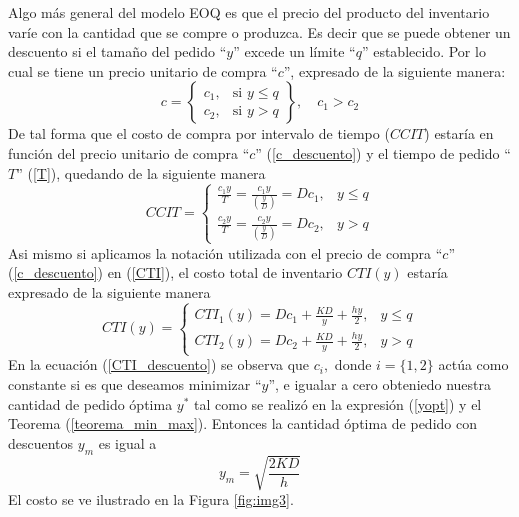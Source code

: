 Algo más general del modelo EOQ es que el precio del producto del inventario  varíe con la cantidad que se compre o produzca. Es decir que se puede obtener un descuento si el tamaño del pedido ``$y$'' excede un límite ``$q$'' establecido. Por lo cual se tiene un precio unitario de compra ``$c$'', expresado de la siguiente manera:
\begin{equation}
	\label{c_descuento}
	c =
	\left\{
	\begin{array}{ll}
		c_1, & \text{si } y \leq q \\
		c_2, & \text{si } y > q
	\end{array}
	\right\}, \quad c_1 > c_2
\end{equation}
De tal forma que el costo de compra por intervalo de tiempo ($CCIT$) estaría en función del precio unitario de compra ``$c$'' (\ref{c_descuento}) y el tiempo de pedido ``$T$'' (\ref{T}), quedando de la siguiente manera
\begin{equation}
	CCIT = \left\{%
	\begin{array}{ll}
		\frac{c_1 y}{T} = \frac{c_1 y}{\left( \frac{y}{D} \right)} = Dc_1 , & y \leq q \\ 
		\frac{c_2 y}{T} = \frac{c_2 y}{\left( \frac{y}{D} \right)} = Dc_2 , & y > q 
	\end{array}%
	\right.
\end{equation}
\clearpage
\noindent Asi mismo si aplicamos la notación utilizada con el precio de compra ``$c$'' (\ref{c_descuento}) en (\ref{CTI}), el costo total de inventario $CTI(y)$ estaría expresado de la siguiente manera
\begin{equation}
	\label{CTI_descuento}
	CTI(y) = \left\{%
	\begin{array}{ll}
		CTI_1 (y) = Dc_1 + \frac{KD}{y} + \frac{hy}{2} , & y \leq q \\ 
		CTI_2 (y) = Dc_2 + \frac{KD}{y} + \frac{hy}{2} , & y > q 
	\end{array}%
	\right.
\end{equation}
En la ecuación (\ref{CTI_descuento}) se observa que $c_i,$ donde $i = \{ 1,2 \}$ actúa como constante si es que deseamos minimizar ``$y$'', e igualar a cero obteniedo nuestra cantidad de pedido óptima $y^*$ tal como se realizó en la expresión (\ref{yopt}) y el Teorema (\ref{teorema_min_max}). Entonces la cantidad óptima de pedido con descuentos $y_m$ es igual a
\begin{equation}
	y_m = \sqrt{\frac{2KD}{h}}
\end{equation}
El costo se ve ilustrado en la Figura \ref{fig:img3}.

